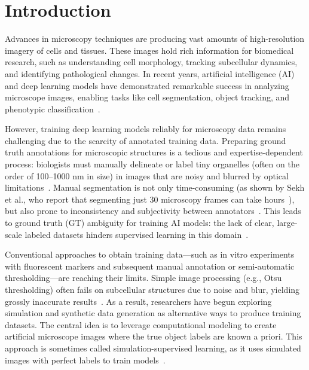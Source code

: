 \documentclass[
oneside,      %
openany       %
]{imc-inf}
\begin{document}
	\tableofcontents%
	\clearpage
	
	\listoffigures         
	\clearpage
	
	
	\mainmatter%
	
	\chapter{Introduction}\label{chap:introduction}
	
	Advances in microscopy techniques are producing vast amounts of high-resolution imagery of cells and tissues. These images hold rich information for biomedical research, such as understanding cell morphology, tracking subcellular dynamics, and identifying pathological changes. In recent years, artificial intelligence (AI) and deep learning models have demonstrated remarkable success in analyzing microscope images, enabling tasks like cell segmentation, object tracking, and phenotypic classification~\cite{ronneberger2015unet,lecun2015deep}.
	
	However, training deep learning models reliably for microscopy data remains challenging due to the scarcity of annotated training data. Preparing ground truth annotations for microscopic structures is a tedious and expertise-dependent process: biologists must manually delineate or label tiny organelles (often on the order of 100–1000 nm in size) in images that are noisy and blurred by optical limitations~\cite{sekh2021}. Manual segmentation is not only time-consuming (as shown by Sekh et al., who report that segmenting just 30 microscopy frames can take hours~\cite{sekh2021}), but also prone to inconsistency and subjectivity between annotators~\cite{litjens2017survey}. This leads to ground truth (GT) ambiguity for training AI models: the lack of clear, large-scale labeled datasets hinders supervised learning in this domain~\cite{litjens2017survey}.
	
	Conventional approaches to obtain training data—such as in vitro experiments with fluorescent markers and subsequent manual annotation or semi-automatic thresholding—are reaching their limits. Simple image processing (e.g., Otsu thresholding) often fails on subcellular structures due to noise and blur, yielding grossly inaccurate results~\cite{otsu1979threshold}. As a result, researchers have begun exploring simulation and synthetic data generation as alternative ways to produce training datasets. The central idea is to leverage computational modeling to create artificial microscope images where the true object labels are known a priori. This approach is sometimes called simulation-supervised learning, as it uses simulated images with perfect labels to train models~\cite{sekh2021}.
	
\end{document}
